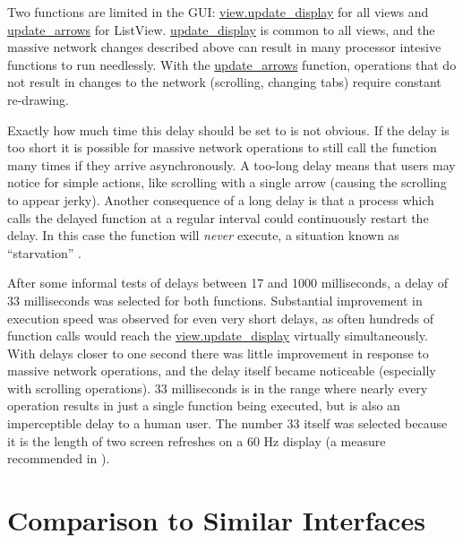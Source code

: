 Two functions are limited in the GUI: \url{view.update_display} for all views and \url{update_arrows} for ListView. \url{update_display} is common to all views, and the massive network changes described above can result in many processor intesive functions to run needlessly. With the \url{update_arrows} function, operations that do not result in changes to the network (scrolling, changing tabs) require constant re-drawing.

Exactly how much time this delay should be set to is not obvious. If the delay is too short it is possible for massive network operations to still call the function many times if they arrive asynchronously. A too-long delay means that users may notice for simple actions, like scrolling with a single arrow (causing the scrolling to appear jerky). Another consequence of a long delay is that a process which calls the delayed function at a regular interval could continuously restart the delay. In this case the function will \emph{never} execute, a situation known as ``starvation'' .

After some informal tests of delays between 17 and 1000 milliseconds, a delay of 33 milliseconds was selected for both functions. Substantial improvement in execution speed was observed for even very short delays, as often hundreds of function calls would reach the \url{view.update_display} virtually simultaneously. With delays closer to one second there was little improvement in response to massive network operations, and the delay itself became noticeable (especially with scrolling operations). 33 milliseconds is in the range where nearly every operation results in just a single function being executed, but is also an imperceptible delay to a human user. The number 33 itself was selected because it is the length of two screen refreshes on a 60 Hz display (a measure recommended in ).
	


\section{Comparison to Similar Interfaces} %
\label{sec:comparison_to_similar_interfaces}

